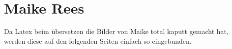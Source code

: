 

\section{Maike Rees}
\label{sec:rees}

Da Latex beim übersetzen die Bilder von Maike total kaputt gemacht hat, werden diese auf den folgenden Seiten einfach so eingebunden.